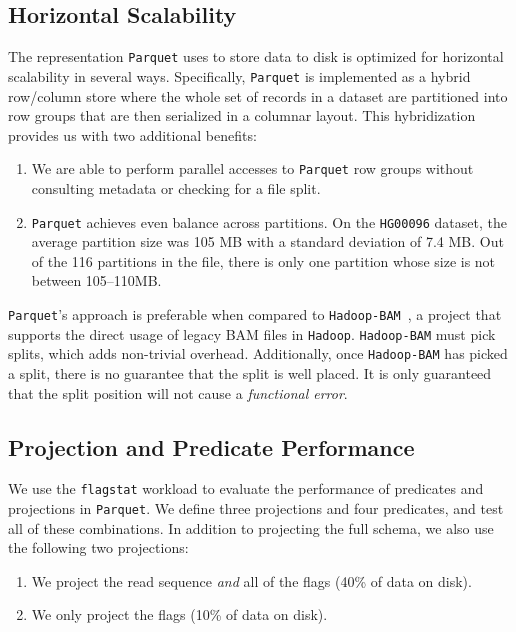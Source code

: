 \documentclass[masters]{ucbthesis}
\begin{document}
\subsection{Horizontal Scalability}
\label{sec:horizontal-scalability}

The representation \texttt{Parquet} uses to store data to disk is optimized for horizontal scalability in several ways.
Specifically, \texttt{Parquet} is implemented as a hybrid row/column store where the whole set of records in a dataset
are partitioned into row groups that are then serialized in a columnar layout. This hybridization provides us with two additional
benefits:

\begin{enumerate}
\item We are able to perform parallel accesses to \texttt{Parquet} row groups without consulting metadata or checking for
a file split.
\item \texttt{Parquet} achieves even balance across partitions. On the \texttt{HG00096} dataset, the average
partition size was 105 MB with a standard deviation of 7.4 MB. Out of the 116 partitions in the file, there is only
one partition whose size is not between 105--110MB.
\end{enumerate}

\texttt{Parquet}'s approach is preferable when compared to \texttt{Hadoop-BAM}~\cite{niemenmaa12}, a project that supports
the direct usage of legacy BAM files in \texttt{Hadoop}. \texttt{Hadoop-BAM} must pick splits, which adds non-trivial overhead.
Additionally, once \texttt{Hadoop-BAM} has picked a split, there is no guarantee that the split is well placed. It is only
guaranteed that the split position will not cause a \emph{functional error}.

\subsection{Projection and Predicate Performance}
\label{sec:projection-predicate-performance}

We use the \texttt{flagstat} workload to evaluate the performance of predicates and projections in \texttt{Parquet}.
We define three projections and four predicates, and test all of these combinations. In addition to projecting the
full schema, we also use the following two projections:

\begin{enumerate}
\item We project the read sequence \emph{and} all of the flags (40\% of data on disk).
\item We only project the flags (10\% of data on disk).
\end{enumerate}
\end{document}
